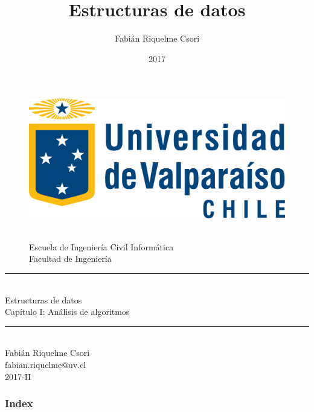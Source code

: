 \documentclass{beamer} %
\title{Estructuras de datos}   %
\author{Fabián Riquelme Csori} %
\date{2017}                    %
\institute{Universidad de Valparaíso}                 %
\newcommand{\HRule}{\rule{\linewidth}{0.2mm}\\[1ex]}
\begin{document}
%

\begin{frame}[plain]
  \begin{figure}[h]
    \begin{minipage}{0.3\textwidth}
    \includegraphics[width=.9\textwidth]{./image/logo-UV.png}
    \end{minipage}
    \begin{minipage}{0.65\textwidth}
     $~$\\[3.6ex]
     \footnotesize{Escuela de Ingeniería Civil Informática}\\
     \footnotesize{Facultad de Ingeniería}
    \end{minipage}
  \end{figure}
  \begin{center}
    \vspace{1ex}
    \HRule
    \Large{Estructuras de datos}\\{\small Capítulo I: Análisis de algoritmos}\\[-1ex]
    \HRule\vspace{1ex}
    \large{Fabián Riquelme Csori}\\[.5ex]\footnotesize{fabian.riquelme@uv.cl}\\[6ex] {\tiny 2017-II}\\[6ex]
  \end{center}
\end{frame}

\begin{frame}
 \frametitle{Index}
 \scriptsize 			%
 \tableofcontents		%
\end{frame}
\end{document}
